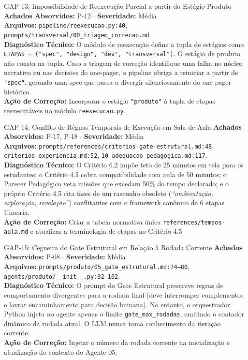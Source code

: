 \documentclass[11pt,a4paper]{article}
\begin{document}
\begin{gapbox}{GAP-13: Impossibilidade de Reexecução Parcial a partir do Estágio Produto}
\textbf{Achados Absorvidos:} P-12 $\cdot$ \textbf{Severidade:} Média\\
\textbf{Arquivos:} \texttt{pipeline/reexecucao.py:40}, \texttt{prompts/transversal/00\_triagem\_correcao.md}.\\
\textbf{Diagnóstico Técnico:} O módulo de reexecução define a tupla de estágios como \texttt{ETAPAS = ("spec", "design", "dev", "transversal")}. O estágio de produto não consta na tupla. Caso a triagem de correção identifique uma falha no núcleo narrativo ou nas decisões do one-pager, o pipeline obriga a reiniciar a partir de \texttt{"spec"}, gerando uma spec que passa a divergir silenciosamente do one-pager histórico.\\
\textbf{Ação de Correção:} Incorporar o estágio \texttt{"produto"} à tupla de etapas reexecutáveis no módulo \texttt{reexecucao.py}.
\end{gapbox}

\begin{gapbox}{GAP-14: Conflito de Réguas Temporais de Execução em Sala de Aula}
\textbf{Achados Absorvidos:} P-17, P-18 $\cdot$ \textbf{Severidade:} Média\\
\textbf{Arquivos:} \texttt{prompts/references/criterios-gate-estrutural.md:48}, \texttt{criterios-experiencia.md:52}, \texttt{10\_adequacao\_pedagogica.md:117}.\\
\textbf{Diagnóstico Técnico:} O Critério 6.2 impõe teto de 25 minutos em tela para os estudantes; o Critério 4.5 cobra compatibilidade com aula de 50 minutos; o Parecer Pedagógico veta missões que excedam 50\% do tempo declarado; e o próprio Critério 4.5 cita fases de um rascunho obsoleto (\textit{``ambientação, exploração, revelação''}) conflitantes com o framework canônico de 6 etapas Unooria.\\
\textbf{Ação de Correção:} Criar a tabela normativa única \texttt{references/tempos-aula.md} e atualizar a terminologia de etapas no Critério 4.5.
\end{gapbox}

\begin{gapbox}{GAP-15: Cegueira do Gate Estrutural em Relação à Rodada Corrente}
\textbf{Achados Absorvidos:} P-08 $\cdot$ \textbf{Severidade:} Média\\
\textbf{Arquivos:} \texttt{prompts/produto/05\_gate\_estrutural.md:74--80}, \texttt{agents/produto/\_\_init\_\_.py:92--102}.\\
\textbf{Diagnóstico Técnico:} O prompt do Gate Estrutural prescreve regras de comportamento divergentes para a rodada final (deve interromper complementos e lavrar encaminhamento para decisão humana). No entanto, o orquestrador Python injeta no agente apenas o limite \texttt{gate\_max\_rodadas}, omitindo o contador dinâmico da rodada atual. O LLM nunca toma conhecimento da iteração corrente.\\
\textbf{Ação de Correção:} Injetar o número da rodada corrente na inicialização e atualização do contexto do Agente 05.
\end{gapbox}
\end{document}
